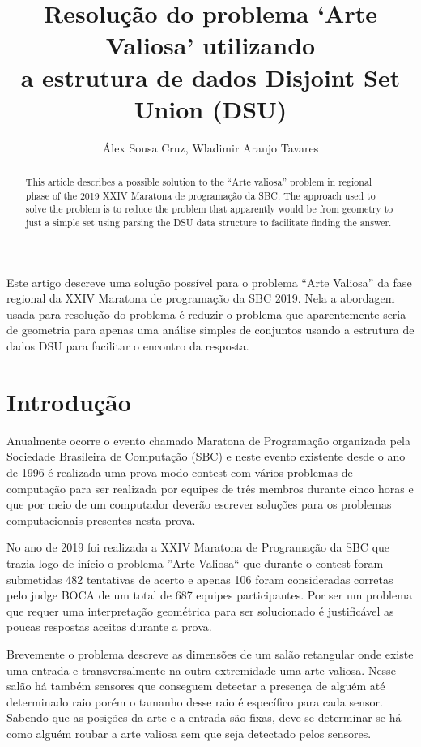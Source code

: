 \documentclass[12pt]{article}
\title{Resolução do problema `Arte Valiosa' utilizando \\a estrutura de dados Disjoint Set Union (DSU)}
\author{Álex Sousa Cruz\inst{1}, Wladimir Araujo Tavares\inst{1}}
\begin{document}
 

\maketitle

\begin{abstract}
  This article describes a possible solution to the ``Arte valiosa'' problem in
  regional phase of the 2019 XXIV Maratona de programação da SBC. The approach
  used to solve the problem is to reduce the problem that apparently
  would be from geometry to just a simple set using parsing
  the DSU data structure to facilitate finding the answer.
\end{abstract}
     
\begin{resumo} 
  Este artigo descreve uma solução possível para o problema ``Arte Valiosa'' da
  fase regional da XXIV Maratona de programação da SBC 2019. Nela a abordagem
  usada para resolução do problema é reduzir o problema que aparentemente
  seria de geometria para apenas uma análise simples de conjuntos usando
  a estrutura de dados DSU para facilitar o encontro da resposta.
\end{resumo}


\section{Introdução}

Anualmente ocorre o evento chamado Maratona de Programação organizada pela Sociedade Brasileira de Computação (SBC) e neste evento existente desde o ano de 1996 é realizada uma prova modo contest com vários problemas de computação para ser realizada por equipes de três membros durante cinco horas e que por meio de um computador deverão escrever soluções para os problemas computacionais presentes nesta prova.

No ano de 2019 foi realizada a XXIV Maratona de Programação da SBC que trazia logo de início o problema ''Arte Valiosa`` que durante o contest foram submetidas 482 tentativas de acerto e apenas 106 foram consideradas corretas pelo judge BOCA de um total de 687 equipes participantes. Por ser um problema que requer uma interpretação geométrica para ser solucionado é justificável as poucas respostas aceitas durante a prova.

Brevemente o problema descreve as dimensões de um salão retangular onde existe uma entrada e transversalmente na outra extremidade uma arte valiosa. Nesse salão há também sensores que conseguem detectar a presença de alguém até determinado raio porém o tamanho desse raio é específico para cada sensor. Sabendo que as posições da arte e a entrada são fixas, deve-se determinar se há como alguém roubar a arte valiosa sem que seja detectado pelos sensores. 
\end{document}
